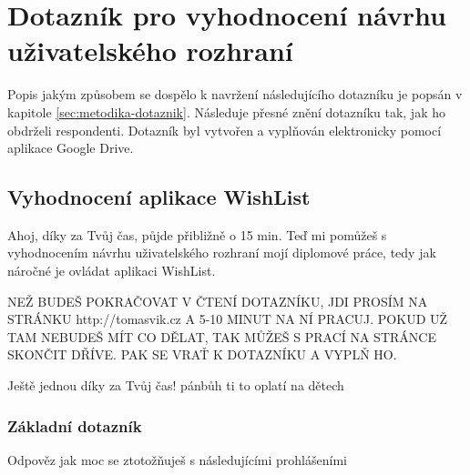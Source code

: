 \chapter{Dotazník pro vyhodnocení návrhu uživatelského rozhraní}
\label{chp:navrh-dotazniku}
Popis jakým způsobem se dospělo k navržení následujícího dotazníku je popsán v kapitole \ref{sec:metodika-dotaznik}. Následuje přesné znění dotazníku tak, jak ho obdrželi respondenti. Dotazník byl vytvořen a vyplňován elektronicky pomocí aplikace Google Drive.

\section{Vyhodnocení aplikace WishList}
Ahoj, díky za Tvůj čas, půjde přibližně o 15 min. Teď mi pomůžeš s vyhodnocením návrhu uživatelského rozhraní mojí diplomové práce, tedy jak náročné je ovládat aplikaci WishList. 

NEŽ BUDEŠ POKRAČOVAT V ČTENÍ DOTAZNÍKU, JDI PROSÍM NA STRÁNKU http://tomasvik.cz A 5-10 MINUT NA NÍ PRACUJ. POKUD UŽ TAM NEBUDEŠ MÍT CO DĚLAT, TAK MŮŽEŠ S PRACÍ NA STRÁNCE SKONČIT DŘÍVE. PAK SE VRAŤ K DOTAZNÍKU A VYPLŇ HO.

Ještě jednou díky za Tvůj čas! pánbůh ti to oplatí na dětech

\subsection{Základní dotazník}
Odpověz jak moc se ztotožňuješ s následujícími prohlášeními

